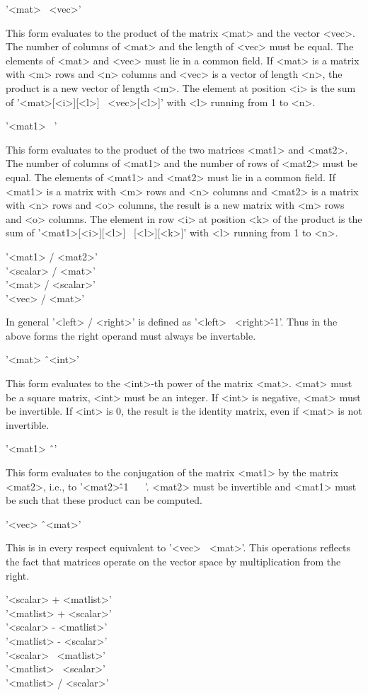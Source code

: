 '<mat> \*\ <vec>'

This form evaluates to the product of  the  matrix  <mat> and the  vector
<vec>.  The number of columns  of <mat> and  the length  of <vec> must be
equal.  The elements of <mat>  and <vec> must lie in a common  field.  If
<mat> is a  matrix with <m> rows and <n> columns and <vec> is a vector of
length <n>, the  product  is a new vector of length <m>.  The element  at
position  <i>  is the sum  of  '<mat>[<i>][<l>]  \*\ <vec>[<l>]' with <l>
running from 1 to <n>.

'<mat1> \*\ <mat2>'

This form evaluates to the product of the two matrices <mat1> and <mat2>.
The number of columns of <mat1> and the number of rows of  <mat2> must be
equal.  The elements of <mat1> and <mat2> must lie in a common field.  If
<mat1> is a matrix with <m>  rows and <n> columns and  <mat2> is a matrix
with  <n> rows and <o> columns, the result is a new  matrix with <m> rows
and  <o> columns.  The element in row <i> at position <k> of the  product
is the sum of '<mat1>[<i>][<l>] \*\  <mat2>[<l>][<k>]'  with  <l> running
from 1 to <n>.

'<mat1> / <mat2>' \\
'<scalar> / <mat>' \\
'<mat> / <scalar>' \\
'<vec> / <mat>'

In general  '<left>  / <right>'  is defined  as '<left> \*\ <right>\^-1'.
Thus in the above forms the right operand must always be invertable.

'<mat> \^\ <int>'

This form evaluates  to  the <int>-th  power of the matrix  <mat>.  <mat>
must be a square matrix, <int> must be an integer.  If <int> is negative,
<mat> must be invertible.   If  <int>  is 0,  the result is the  identity
matrix, even if <mat> is not invertible.

'<mat1> \^\ <mat2>'

This form evaluates to the conjugation of the matrix <mat1> by the matrix
<mat2>,  i.e., to '<mat2>\^-1  \*\  <mat1>  \*\  <mat2>'.  <mat2> must be
invertible and <mat1> must be such that these product can be computed.

'<vec> \^\ <mat>'

This  is  in  every  respect  equivalent  to  '<vec>  \*\  <mat>'.   This
operations reflects the fact that matrices operate on the vector space by
multiplication from the right.

'<scalar> + <matlist>' \\
'<matlist> + <scalar>' \\
'<scalar> - <matlist>' \\
'<matlist> - <scalar>' \\
'<scalar> \*\ <matlist>' \\
'<matlist> \*\ <scalar>' \\
'<matlist> / <scalar>'

